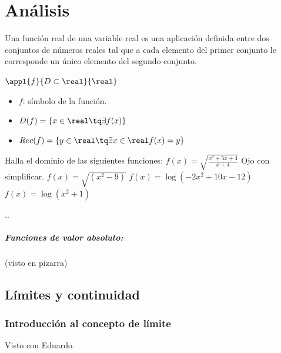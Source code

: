 
\chapter{Análisis}

\begin{defn}
Una función real de una variable real es una aplicación definida entre dos conjuntos de números reales tal que a cada elemento del primer conjunto le corresponde un único elemento del segundo conjunto.

$\appl{f}{D\subset\real}{\real}$

\begin{itemize}
	\item $f$: símbolo de la función.
	\item $D(f) = \{x\in\real \tq \exists f(x)\}$
	\item $Rec(f) = \{y\in\real \tq \exists x \in\real f(x)=y\}$
\end{itemize}
\end{defn}


\begin{problem}
Halla el dominio de las siguientes funciones:
\ppart $f(x) = \sqrt{\displaystyle\frac{x^2+5x+4}{x+4}}$ \obs Ojo con simplificar.
\ppart $f(x) = \sqrt{\left(x^2-9\right)}$
\ppart  $f(x) = \log\left(-2x^2+10x-12\right)$
\ppart  $f(x) = \log\left(x^2+1\right)$

\solution


.\vspace{15cm}.


\end{problem}

\paragraph{Funciones de valor absoluto:} (visto en pizarra)


\section{Límites y continuidad}

\subsection{Introducción al concepto de límite}

Visto con Eduardo.


